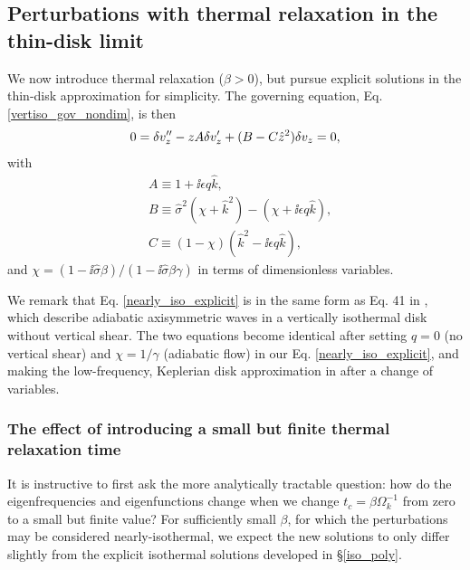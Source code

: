 \subsection{Perturbations with thermal relaxation in the thin-disk limit}\label{analytic_relax}
We now introduce thermal relaxation ($\beta>0$), but pursue explicit
solutions in the thin-disk approximation for simplicity. The governing
equation, Eq. \ref{vertiso_gov_nondim}, is then 
\begin{align}
  0 = \delta v_z^{\prime\prime} - z A\delta v_z^\prime +
  (B - C\hat{z}^2)\delta v_z = 0,\label{nearly_iso_explicit}
\end{align}
with
\begin{align}
  &A \equiv 1 + \ii \epsilon q \hat{k},\\
  &B \equiv \hat{\sigma}^2\left(\chi + \hat{k}^2\right) -
  \left(\chi + \ii \epsilon q \hat{k}\right),\\
  &C \equiv \left(1-\chi\right)\left(\hat{k}^2 - \ii
    \epsilon q\hat{k}\right), 
\end{align}
and $\chi =
\left(1-\ii\hat{\sigma}\beta\right)/\left(1-\ii\hat{\sigma}\beta\gamma\right)
$ in terms of dimensionless variables. 

We remark that Eq. \ref{nearly_iso_explicit} is in the same 
form as Eq. 41 in \cite{lubow93}, which describe adiabatic axisymmetric waves in
a vertically isothermal disk without vertical shear. The two equations
become identical after  setting $q=0$ (no vertical shear) and
$\chi=1/\gamma$ (adiabatic flow) in our Eq. \ref{nearly_iso_explicit},
and making the low-frequency, Keplerian disk approximation in
\citeauthor{lubow93} after a change of variables.    

\subsubsection{The effect of introducing a small but finite
  thermal relaxation time}\label{relax_pert}
It is instructive to first ask  the more analytically tractable
question: how 
do the eigenfrequencies and eigenfunctions change when we change
$t_c=\beta\Omega_k^{-1}$ from zero to a small but finite value? For
sufficiently small $\beta$, for which the perturbations may be
considered nearly-isothermal, we expect the new solutions to only
differ slightly from the explicit isothermal solutions developed in
\S\ref{iso_poly}.  

